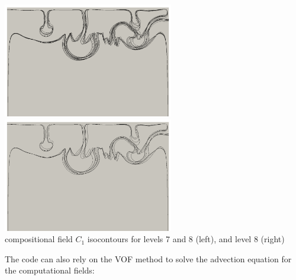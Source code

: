 \begin{itemize}
\begin{center}
\includegraphics[height=5cm]{images/benchmark_vaks97/aspect/contours_78}
\includegraphics[height=5cm]{images/benchmark_vaks97/aspect/contours_8}\\
{ compositional field $C_1$ isocontours for levels 7 and 8 (left), 
and level 8 (right)} 
\end{center}


\newpage
The code can also rely on the VOF method to solve the advection equation 
for the computational fields:


\end{itemize}
